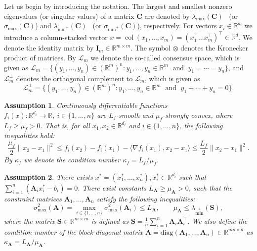 \documentclass{article}
\newtheorem{assumption}{Assumption}
\DeclareMathOperator{\col}{\mathrm{col}}
\newcommand{\lmax}{\lambda_{\max}}
\newcommand{\smax}{\sigma_{\max}}
\newcommand{\sminp}{\sigma_{\min^+}}
\newcommand{\lminp}{\lambda_{\min^+}}
\newcommand{\R}{\mathbb{R}}
\def\<#1,#2>{\langle #1,#2\rangle}
\newcommand{\norm}[1]{\|#1\|}
\newcommand{\sqn}[1]{\norm{#1}^2}
\newcommand{\diag}[1]{\mathrm{diag}\left(#1\right)}
\newcommand{\rng}[2]{\{#1,\ldots,#2\}}
\newcommand{\cL}{\mathcal{L}}
\newcommand{\mA}{\mathbf{A}}
\newcommand{\mC}{\mathbf{C}}
\newcommand{\mS}{\mathbf{S}}
\newcommand{\mI}{\mathbf{I}}
\begin{document}
Let us begin by introducing the notation. 
The largest and smallest nonzero eigenvalues (or singular values) of a matrix $\mC$ are denoted by $\lmax(\mC)$~ (or $\smax(\mC)$) and $\lminp(\mC)$~ (or $\sminp(\mC)$), respectively. For vectors $x_i \in \R^{d_i}$ we introduce a column-stacked vector $x = \col(x_1, \ldots, x_m) = (x_1^\top \ldots x_m^\top)^\top\in\R^{d}$. We denote the identity matrix by $\mI_m \in \R^{m \times m}$. The symbol $\otimes$ denotes the Kronecker product of matrices. 
By $\cL_m$ we denote the so-called consensus space, which is given as $\cL_m = \{(y_1,\ldots,y_n) \in (\R^m)^n : y_1 , \ldots , y_n \in \R^m\; \text{ and }\; y_1 = \cdots = y_n\}$, and $\cL_m^\perp$ denotes the orthogonal complement to $\cL_m$, which is given as
\begin{equation}\label{eq:Lperp}
	\cL_m^\perp = \{(y_1,\ldots,y_n) \in (\R^m)^n : y_1 , \ldots , y_n \in \R^m\;\text{ and }\; y_1 + \cdots + y_n = 0\}.
\end{equation}


\begin{assumption}\label{ass:f}
  Continuously differentiable functions $f_i(x) \colon \R^{d_i} \to \R , \ i \in \rng{1}{n} $ are $L_f$-smooth and $\mu_f$-strongly convex, where $L_f \geq \mu_f > 0$.
  That is, for all $x_1,x_2 \in \R^{d_i}$ and $i \in \rng{1}{n}$, the following inequalities hold:
	\begin{equation*}
		\frac{\mu_f}{2}\sqn{x_2 - x_1}
		\leq
		f_i(x_2) - f_i(x_1) - \<\nabla f_i(x_1), x_2 - x_1>
		\leq
		\frac{L_f}{2}\sqn{x_2 - x_1}.
	\end{equation*}
	By $\kappa_{f}$ we denote the condition number $\kappa_{f} = {L_{f}}/{\mu_{f}}$.
\end{assumption}

\begin{assumption}\label{ass:A}
    There exists $x^* = (x^*_1,\ldots,x^*_n), x^*_i \in \R^{d_i}$ such that $\sum_{i=1}^{n} (\mA_i x^*_i - b_i) = 0$.
	There exist constants $L_{\mA}\geq \mu_{\mA} > 0$, such that the constraint matrices  $\mA_1,\ldots,\mA_n$ satisfy the following inequalities:
	\begin{equation}\label{eq:def_mu_a_L_a}
		\smax^2(\mA) = \max_{i \in \rng{1}{n}} \smax^2(\mA_i) \leq L_{\mA},
    \qquad
		\mu_{\mA} \leq \lminp\left( \mS \right),
	\end{equation}
	where the matrix $\mS \in \R^{m\times m}$ is defined as $\mS = \frac{1}{n}\sum_{i=1}^{n} \mA_i \mA_i^\top$. 
    We also define the condition number of 
the block-diagonal matrix $\mA = \diag{\mA_1, \ldots,\mA_n}\in \R^{mn \times d}$
 as $\kappa_{\mA} = L_\mA / \mu_\mA$.
\end{assumption}
\end{document}
